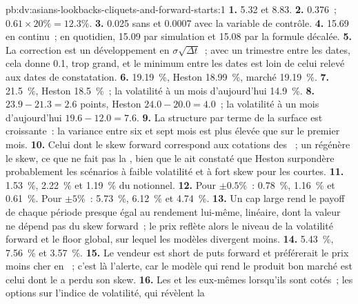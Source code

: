 \begin{solution}{pb:dv:asians-lookbacks-cliquets-and-forward-starts:1}
\textbf{1.} 5.32 et 8.83.
\textbf{2.} 0.376~; $0.61\times20\%=12.3\%$.
\textbf{3.} 0.025 sans et 0.0007 avec la variable de contrôle.
\textbf{4.} 15.69 en continu~; en quotidien, 15.09 par simulation et 15.08 par la formule décalée.
\textbf{5.} La correction est un développement en $\sigma\sqrt{\Delta t}$~; avec un trimestre entre les dates, cela donne 0.1, trop grand, et
le minimum entre les dates est loin de celui relevé aux dates de constatation.
\textbf{6.}  19.19~\%, Heston 18.99~\%, marché 19.19~\%.
\textbf{7.}  21.5~\%, Heston 18.5~\%~; la volatilité à un mois d'aujourd'hui 14.9~\%.
\textbf{8.}  $23.9-21.3=2.6$ points, Heston $24.0-20.0=4.0$~; la volatilité à un mois d'aujourd'hui $19.6-12.0=7.6$.
\textbf{9.} La structure par terme de la surface est croissante~: la variance entre six et sept mois est plus élevée que sur le premier
mois.
\textbf{10.} Celui dont le skew forward correspond aux cotations des ~; un  régénère le skew,
ce que ne fait pas la , bien que le  ait constaté que Heston surpondère probablement les scénarios
à faible volatilité et à fort skew pour les  courtes.
\textbf{11.} 1.53~\%, 2.22~\% et 1.19~\% du notionnel.
\textbf{12.} Pour $\pm0.5\%$~: 0.78~\%, 1.16~\% et 0.61~\%. Pour $\pm5\%$~: 5.73~\%, 6.12~\% et 4.74~\%.
\textbf{13.} Un cap large rend le payoff de chaque période presque égal au rendement lui-même, linéaire, dont la valeur ne dépend pas du
skew forward~; le prix reflète alors le niveau de la volatilité forward et le floor global, sur lequel les modèles divergent moins.
\textbf{14.} 5.43~\%, 7.56~\% et 3.57~\%.
\textbf{15.} Le vendeur est short de puts forward et préférerait le prix moins cher en ~; c'est là l'alerte,
car le modèle qui rend le produit bon marché est celui dont le  a perdu son skew.
\textbf{16.} Les  et les  eux-mêmes lorsqu'ils sont cotés~; les options sur l'indice de volatilité, qui révèlent la

\end{solution}
